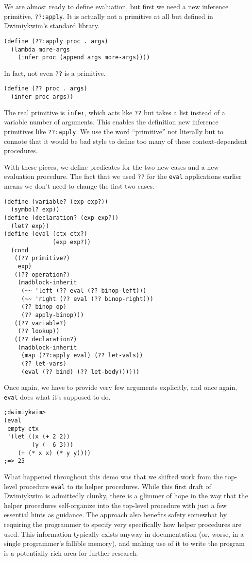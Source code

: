 \documentclass[11pt]{article}
\begin{document}
We are almost ready to define evaluation,
but first we need a new inference primitive, \texttt{??:apply}.
It is actually not a primitive at all
but defined in Dwimiykwim's standard library.
\begin{Verbatim}
(define (??:apply proc . args)
  (lambda more-args
    (infer proc (append args more-args))))
\end{Verbatim}
In fact, not even \texttt{??} is a primitive.
\begin{Verbatim}
(define (?? proc . args)
  (infer proc args))
\end{Verbatim}
The real primitive is \texttt{infer},
which acts like \texttt{??}
but takes a list instead of a variable number of arguments.
This enables the definition new inference primitives like \texttt{??:apply}.
We use the word ``primitive'' not literally
but to connote that it would be bad style to define too many of these
context-dependent procedures.

With these pieces, we define predicates for the two new cases
and a new evaluation procedure.
The fact that we used \texttt{??} for the \texttt{eval} applications earlier
means we don't need to change the first two cases.
\begin{Verbatim}
(define (variable? (exp exp?))
  (symbol? exp))
(define (declaration? (exp exp?))
  (let? exp))
(define (eval (ctx ctx?)
              (exp exp?))
  (cond
   ((?? primitive?)
    exp)
   ((?? operation?)
    (madblock-inherit
     (~~ 'left (?? eval (?? binop-left)))
     (~~ 'right (?? eval (?? binop-right)))
     (?? binop-op)
     (?? apply-binop)))
   ((?? variable?)
    (?? lookup))
   ((?? declaration?)
    (madblock-inherit
     (map (??:apply eval) (?? let-vals))
     (?? let-vars)
     (eval (?? bind) (?? let-body))))))
\end{Verbatim}
Once again, we have to provide very few arguments explicitly,
and once again, \texttt{eval} does what it's supposed to do.
\begin{Verbatim}
;dwimiykwim>
(eval
 empty-ctx
 '(let ((x (+ 2 2))
        (y (- 6 3)))
    (+ (* x x) (* y y))))
;=> 25
\end{Verbatim}

What happened throughout this demo was that we shifted work from
the top-level procedure \texttt{eval} to its helper procedures.
While this first draft of Dwimiykwim is admittedly clunky,
there is a glimmer of hope in the way that the helper procedures
self-organize into the top-level procedure
with just a few essential hints as guidance.
The approach also benefits safety somewhat
by requiring the programmer to specify very specifically
how helper procedures are used.
This information typically exists anyway in documentation
(or, worse, in a single programmer's fallible memory),
and making use of it to write the program
is a potentially rich area for further research.
\end{document}
